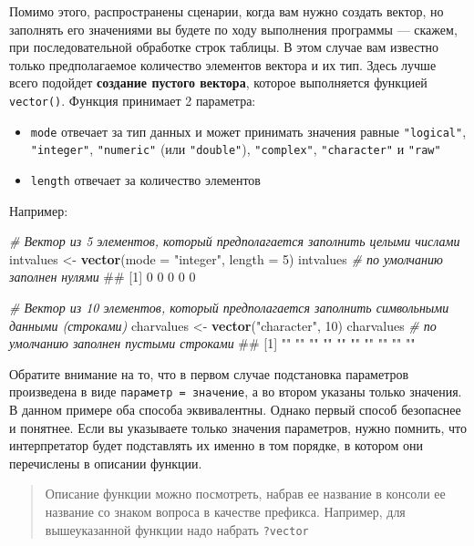 \documentclass[]{book}
\newenvironment{Shaded}{\begin{snugshade}}{\end{snugshade}}
\newcommand{\KeywordTok}[1]{\textcolor[rgb]{0.13,0.29,0.53}{\textbf{#1}}}
\newcommand{\DataTypeTok}[1]{\textcolor[rgb]{0.13,0.29,0.53}{#1}}
\newcommand{\DecValTok}[1]{\textcolor[rgb]{0.00,0.00,0.81}{#1}}
\newcommand{\StringTok}[1]{\textcolor[rgb]{0.31,0.60,0.02}{#1}}
\newcommand{\CommentTok}[1]{\textcolor[rgb]{0.56,0.35,0.01}{\textit{#1}}}
\newcommand{\NormalTok}[1]{#1}
\providecommand{\tightlist}{%
  \setlength{\itemsep}{0pt}\setlength{\parskip}{0pt}}
\begin{document}
Помимо этого, распространены сценарии, когда вам нужно создать вектор,
но заполнять его значениями вы будете по ходу выполнения программы ---
скажем, при последовательной обработке строк таблицы. В этом случае вам
известно только предполагаемое количество элементов вектора и их тип.
Здесь лучше всего подойдет \textbf{создание пустого вектора}, которое
выполняется функцией \texttt{vector()}. Функция принимает 2 параметра:

\begin{itemize}
\tightlist
\item
  \texttt{mode} отвечает за тип данных и может принимать значения равные
  \texttt{"logical"}, \texttt{"integer"}, \texttt{"numeric"} (или
  \texttt{"double"}), \texttt{"complex"}, \texttt{"character"} и
  \texttt{"raw"}
\item
  \texttt{length} отвечает за количество элементов
\end{itemize}

Например:

\begin{Shaded}
\begin{Highlighting}[]
\CommentTok{# Вектор из 5 элементов, который предполагается заполнить целыми числами}
\NormalTok{intvalues <-}\StringTok{ }\KeywordTok{vector}\NormalTok{(}\DataTypeTok{mode =} \StringTok{"integer"}\NormalTok{, }\DataTypeTok{length =} \DecValTok{5}\NormalTok{)}
\NormalTok{intvalues }\CommentTok{# по умолчанию заполнен нулями}
\NormalTok{## [1] 0 0 0 0 0}

\CommentTok{# Вектор из 10 элементов, который предполагается заполнить символьными данными (строками)}
\NormalTok{charvalues <-}\StringTok{ }\KeywordTok{vector}\NormalTok{(}\StringTok{"character"}\NormalTok{, }\DecValTok{10}\NormalTok{)}
\NormalTok{charvalues }\CommentTok{# по умолчанию заполнен пустыми строками}
\NormalTok{##  [1] "" "" "" "" "" "" "" "" "" ""}
\end{Highlighting}
\end{Shaded}

Обратите внимание на то, что в первом случае подстановка параметров
произведена в виде \texttt{параметр\ =\ значение}, а во втором указаны
только значения. В данном примере оба способа эквивалентны. Однако
первый способ безопаснее и понятнее. Если вы указываете только значения
параметров, нужно помнить, что интерпретатор будет подставлять их именно
в том порядке, в котором они перечислены в описании функции.

\begin{quote}
Описание функции можно посмотреть, набрав ее название в консоли ее
название со знаком вопроса в качестве префикса. Например, для
вышеуказанной функции надо набрать \texttt{?vector}
\end{quote}
\end{document}
